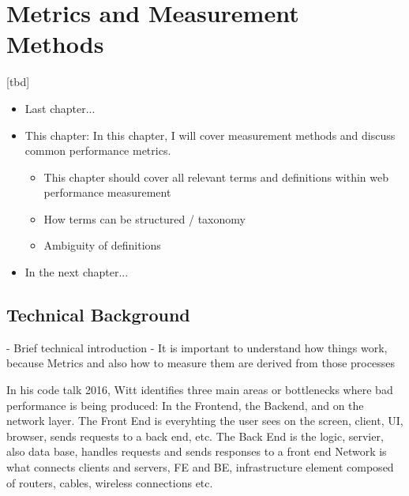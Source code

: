 \chapter{Metrics and Measurement Methods}

[tbd]

\begin{itemize}
	\item Last chapter...
	\item This chapter: In this chapter, I will cover measurement methods and discuss common performance metrics.
	\begin{itemize}
		\item This chapter should cover all relevant terms and definitions within web performance measurement
		\item How terms can be structured / taxonomy
		\item Ambiguity of definitions
	\end{itemize}
	\item In the next chapter...
\end{itemize}







\section{Technical Background}

- Brief technical introduction
- It is important to understand how things work, because Metrics and also how to measure them are derived from those processes


In his code talk 2016, Witt identifies three main areas or bottlenecks where bad performance is being produced: In the Frontend, the Backend, and on the network layer.  %
The Front End is everyhting the user sees on the screen, client, UI, browser, sends requests to a back end, etc.
The Back End is the logic, servier, also data base, handles requests and sends responses to a front end
Network is what connects clients and servers, FE and BE, infrastructure element composed of routers, cables, wireless connections etc.


